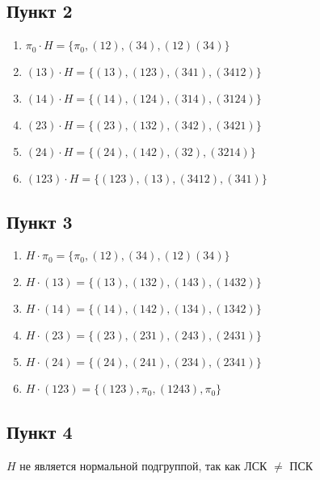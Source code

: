 \documentclass{article}
\begin{document}
\subsection*{Пункт 2}
\begin{enumerate}
    \item $\pi_0 \cdot H = \{\pi_0, (12) , (34) , (12)(34)\}$
    \item $(13)  \cdot H = \{(13) , (123), (341), (3412)  \}$
    \item $(14)  \cdot H = \{(14) , (124), (314), (3124)  \}$
    \item $(23)  \cdot H = \{(23) , (132), (342), (3421)  \}$
    \item $(24)  \cdot H = \{(24) , (142), (32) , (3214)  \}$
    \item $(123) \cdot H = \{(123), (13) , (3412), (341)  \}$
\end{enumerate}

\subsection*{Пункт 3}
\begin{enumerate}
    \item $H \cdot \pi_0 = \{\pi_0, (12) , (34) , (12)(34)\}$
    \item $H \cdot (13)  = \{(13) , (132), (143), (1432)  \}$
    \item $H \cdot (14)  = \{(14) , (142), (134), (1342)  \}$
    \item $H \cdot (23)  = \{(23) , (231), (243), (2431)  \}$
    \item $H \cdot (24)  = \{(24) , (241), (234), (2341)  \}$
    \item $H \cdot (123) = \{(123), \pi_0, (1243), \pi_0  \}$
\end{enumerate}

\subsection*{Пункт 4}
$H$ не является нормальной подгруппой, так как ЛСК $\ne$ ПСК
\end{document}
